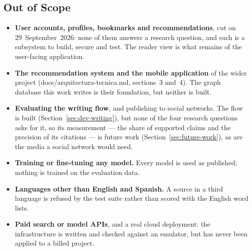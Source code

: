 
\subsection{Out of Scope}

\begin{itemize}
    \item \textbf{User accounts, profiles, bookmarks and
    recommendations}, cut on 29~September~2026: none of them answers a
    research question, and each is a subsystem to build, secure and
    test. The reader view is what remains of the user-facing
    application.
    \item \textbf{The recommendation system and the mobile
    application} of the wider project (docs/arquitectura-tecnica.md,
    sections~3 and~4). The graph database this work writes is their
    foundation, but neither is built.
    \item \textbf{Evaluating the writing flow}, and publishing to
    social networks. The flow is built (Section~\ref{sec:dev-writing}),
    but none of the four research questions asks for it, so its
    measurement --- the share of supported claims and the precision of
    its citations --- is future work (Section~\ref{sec:future-work}),
    as are the media a social network would need.
    \item \textbf{Training or fine-tuning any model.} Every model is
    used as published; nothing is trained on the evaluation data.
    \item \textbf{Languages other than English and Spanish.} A source
    in a third language is refused by the test suite rather than scored
    with the English word lists.
    \item \textbf{Paid search or model APIs}, and a real cloud
    deployment: the infrastructure is written and checked against an
    emulator, but has never been applied to a billed project.
\end{itemize}
